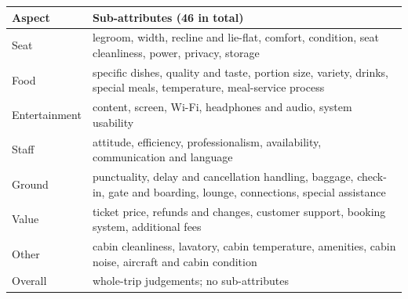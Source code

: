 \documentclass[10pt,twocolumn,a4paper]{article}
\begin{document}
\begin{center}\small
\begin{tabularx}{\textwidth}{@{}P{30mm}Y@{}}
\toprule
\textbf{Aspect} & \textbf{Sub-attributes (46 in total)} \\
\midrule
Seat & legroom, width, recline and lie-flat, comfort, condition, seat cleanliness, power, privacy, storage \\
Food & specific dishes, quality and taste, portion size, variety, drinks, special meals, temperature, meal-service process \\
Entertainment & content, screen, Wi-Fi, headphones and audio, system usability \\
Staff & attitude, efficiency, professionalism, availability, communication and language \\
Ground & punctuality, delay and cancellation handling, baggage, check-in, gate and boarding, lounge, connections, special assistance \\
Value & ticket price, refunds and changes, customer support, booking system, additional fees \\
Other & cabin cleanliness, lavatory, cabin temperature, amenities, cabin noise, aircraft and cabin condition \\
Overall & whole-trip judgements; no sub-attributes \\
\bottomrule
\end{tabularx}
\end{center}
\end{document}
